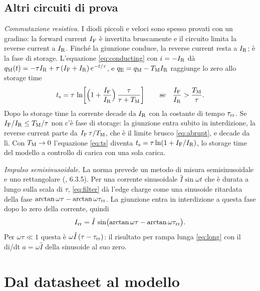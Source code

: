 \documentclass[10pt,a4paper]{scrartcl}
\let\newcommand\lmitdefine
\newcommand{\IF}{I_\mathrm{F}}
\newcommand{\IR}{I_\mathrm{R}}
\newcommand{\Irr}{I_\mathrm{rr}}
\newcommand{\ts}{t_\mathrm{s}}
\newcommand{\taurr}{\tau_\mathrm{rr}}
\newcommand{\TM}{T_\mathrm{M}}
\newcommand{\qE}{q_\mathrm{E}}
\newcommand{\qM}{q_\mathrm{M}}
\begin{document}
\subsection{Altri circuiti di prova}
\label{sec:othertests}
\emph{Commutazione resistiva.} I diodi piccoli e veloci sono spesso provati con un gradino: la forward current $\IF$ è invertita bruscamente e il circuito limita la reverse current a $\IR$. Finché la giunzione conduce, la reverse current resta a $\IR$; è la fase di storage. L'equazione \eqref{eq:conducting} con $i = -\IR$ dà $\qM(t) = -\tau\IR + \tau\,(\IF+\IR)\,e^{-t/\tau}$, e $\qE = \qM - \TM\IR$ raggiunge lo zero allo storage time
\begin{equation}
\ts = \tau\,\ln\!\left[\Bigl(1+\frac{\IF}{\IR}\Bigr)\,\frac{\tau}{\tau+\TM}\right] \qquad \text{se} \quad \frac{\IF}{\IR} > \frac{\TM}{\tau} .
\label{eq:ts}
\end{equation}
Dopo lo storage time la corrente decade da $\IR$ con la costante di tempo $\taurr$. Se $\IF/\IR \leq \TM/\tau$ non c'è fase di storage: la giunzione entra subito in interdizione, la reverse current parte da $\IF\,\tau/\TM$, che è il limite brusco \eqref{eq:abrupt}, e decade da lì. Con $\TM \to 0$ l'equazione \eqref{eq:ts} diventa $\ts = \tau\ln(1+\IF/\IR)$, lo storage time del modello a controllo di carica con una sola carica.

\emph{Impulso semisinusoidale.} La norma prevede un metodo di misura semisinusoidale e uno rettangolare (\cite{iec60747}, 6.3.5). Per una corrente sinusoidale $\hat I\sin\omega t$ che è durata a lungo sulla scala di $\tau$, \eqref{eq:filter} dà l'edge charge come una sinusoide ritardata della fase $\arctan\omega\tau - \arctan\omega\taurr$. La giunzione entra in interdizione a questa fase dopo lo zero della corrente, quindi
\begin{equation}
\Irr = \hat I\,\sin\bigl(\arctan\omega\tau - \arctan\omega\taurr\bigr) .
\label{eq:sine}
\end{equation}
Per $\omega\tau \ll 1$ questa è $\omega\hat I\,(\tau-\taurr)$: il risultato per rampa lunga \eqref{eq:long} con il di/dt $a = \omega\hat I$ della sinusoide al suo zero.

\section{Dal datasheet al modello}
\label{sec:inverse}
\end{document}
